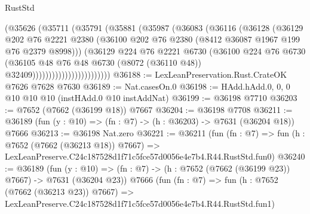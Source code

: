 \begin{lexlean}{RustStd}
\begin{coremodule}
                              (@35626
                                (@35711
                                  (@35791
                                    (@35881
                                      (@35987
                                        (@36083
                                          (@36116
                                            (@36128
                                              (@36129
                                                @202
                                                @76
                                                @2221
                                                @2380
                                                (@36100
                                                  @202
                                                  @76
                                                  @2380
                                                  (@8412 @36087 @1967 @199 @76 @2379 @8998)))
                                              (@36129
                                                @224
                                                @76
                                                @2221
                                                @6730
                                                (@36100
                                                  @224
                                                  @76
                                                  @6730
                                                  (@36105
                                                    @48
                                                    @76
                                                    @48
                                                    @6730
                                                    (@8072 (@36110 @48))
                                                    @32409))))))))))))))))))))))))
@36188 := LexLeanPreservation.Rust.CrateOK @7626 @7628 @7630
@36189 := Nat.casesOn.{0}
@36198 := HAdd.hAdd.{0, 0, 0} @10 @10 @10 (instHAdd.{0} @10 instAddNat)
@36199 := @36198 @7710
@36203 := @7652 (@7662 (@36199 @18)) @7667
@36204 := @36198 @7708
@36211 := @36189 (fun (y : @10) => (fn : @7) -> (h : @36203) -> @7631 (@36204 @18)) @7666
@36213 := @36198 Nat.zero
@36221 := @36211
    (fun (fn : @7) =>
    fun (h : @7652 (@7662 (@36213 @18)) @7667) =>
    LexLeanPreserve.C24c187528d1f71c5fce57d0056e4e7b4.R44.RustStd.fun0)
@36240 := @36189
    (fun (y : @10) => (fn : @7) -> (h : @7652 (@7662 (@36199 @23)) @7667) -> @7631 (@36204 @23))
    @7666
    (fun (fn : @7) =>
    fun (h : @7652 (@7662 (@36213 @23)) @7667) =>
    LexLeanPreserve.C24c187528d1f71c5fce57d0056e4e7b4.R44.RustStd.fun1)

\end{coremodule}
\end{lexlean}
